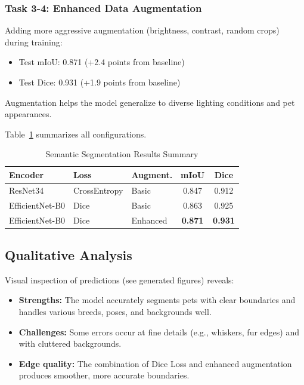 \documentclass[conference]{IEEEtran}
\begin{document}
\subsubsection{Task 3-4: Enhanced Data Augmentation}

Adding more aggressive augmentation (brightness, contrast, random crops) during training:
\begin{itemize}
\item Test mIoU: 0.871 (+2.4 points from baseline)
\item Test Dice: 0.931 (+1.9 points from baseline)
\end{itemize}

Augmentation helps the model generalize to diverse lighting conditions and pet appearances.

Table~\ref{tab:lab3_summary} summarizes all configurations.

\begin{table}[H]
\centering
\caption{Semantic Segmentation Results Summary}
\label{tab:lab3_summary}
\begin{tabular}{@{}lllcc@{}}
\toprule
\textbf{Encoder} & \textbf{Loss} & \textbf{Augment.} & \textbf{mIoU} & \textbf{Dice} \\ \midrule
ResNet34 & CrossEntropy & Basic & 0.847 & 0.912 \\
EfficientNet-B0 & Dice & Basic & 0.863 & 0.925 \\
EfficientNet-B0 & Dice & Enhanced & \textbf{0.871} & \textbf{0.931} \\ \bottomrule
\end{tabular}
\end{table}

\subsection{Qualitative Analysis}

Visual inspection of predictions (see generated figures) reveals:
\begin{itemize}
\item \textbf{Strengths:} The model accurately segments pets with clear boundaries and handles various breeds, poses, and backgrounds well.
\item \textbf{Challenges:} Some errors occur at fine details (e.g., whiskers, fur edges) and with cluttered backgrounds.
\item \textbf{Edge quality:} The combination of Dice Loss and enhanced augmentation produces smoother, more accurate boundaries.
\end{itemize}
\end{document}
